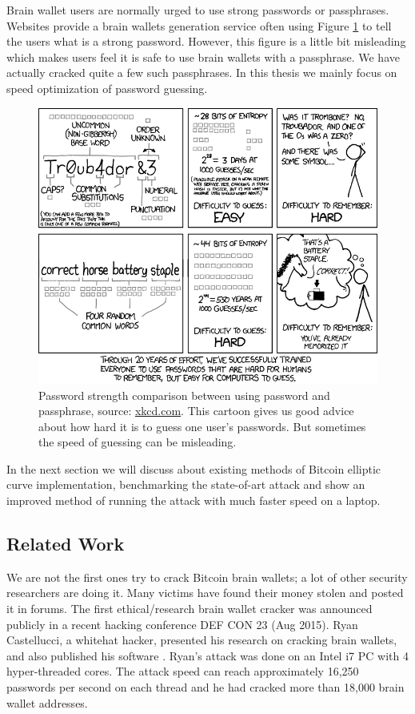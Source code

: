 Brain wallet users are normally urged to use strong passwords or passphrases. Websites provide a brain wallets generation service often using Figure \ref{fig:password_strength} to tell the users what is a strong password. However, this figure is a little bit misleading which makes users feel it is safe to use brain wallets with a passphrase. We have actually cracked quite a few such passphrases. In this thesis we mainly focus on speed optimization of password guessing.

\begin{figure}[h!]
	\centering
	\includegraphics[width=140mm]{./pics/password_strength.png}
	\caption[Password strength comparison between using password and passphrase]{Password strength comparison between using password and passphrase, source: \url{xkcd.com}. This cartoon gives us good advice about how hard it is to guess one user's passwords. But sometimes the speed of guessing can be misleading.}
	\label{fig:password_strength}
\end{figure}

In the next section we will discuss about existing methods of Bitcoin elliptic curve implementation, benchmarking the state-of-art attack and show an improved method of running the attack with much faster speed on a laptop. 
\subsection{Related Work} \label{sec:brainwalletRelatedWork}
We are not the first ones try to crack Bitcoin brain wallets; a lot of other security researchers are doing it. Many victims have found their money stolen and posted it in forums. The first ethical/research brain wallet cracker was announced publicly in a recent hacking conference DEF CON 23 (Aug 2015). Ryan Castellucci, a whitehat hacker, presented his research on cracking brain wallets, and also published his software \cite{RyanDefcon}. Ryan's attack was done on an Intel i7 PC with 4 hyper-threaded cores. The attack speed can reach approximately 16,250 passwords per second on each thread and he had cracked more than 18,000 brain wallet addresses.

